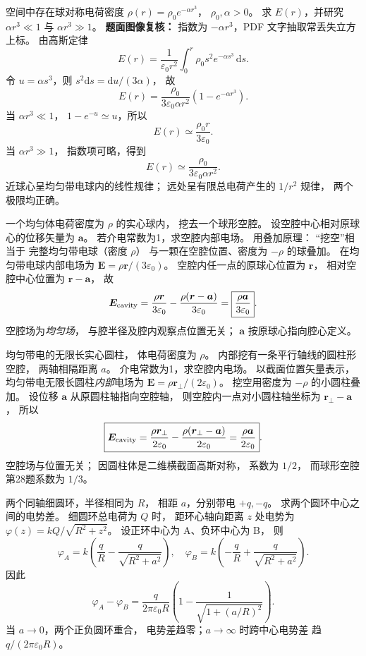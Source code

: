 空间中存在球对称电荷密度
$\rho(r)=\rho_0e^{-\alpha r^3}$，
$\rho_0,\alpha>0$。
求 $E(r)$，并研究
$\alpha r^3\ll1$ 与 $\alpha r^3\gg1$。
\exsolution
\textbf{题面图像复核：} 指数为
$-\alpha r^3$，PDF 文字抽取常丢失立方上标。
由高斯定律
\[
E(r)=\frac{1}{\varepsilon_0r^2}
\int_0^r\rho_0s^2e^{-\alpha s^3}\,\mathrm ds.
\]
令 $u=\alpha s^3$，则
$s^2\mathrm ds=\mathrm du/(3\alpha)$，
故
\[
\boxed{E(r)=\frac{\rho_0}
{3\varepsilon_0\alpha r^2}
(1-e^{-\alpha r^3})}.
\]
当 $\alpha r^3\ll1$，
$1-e^{-u}\simeq u$，所以
\[
\boxed{E(r)\simeq\frac{\rho_0r}{3\varepsilon_0}}.
\]
当 $\alpha r^3\gg1$，
指数项可略，得到
\[
\boxed{E(r)\simeq\frac{\rho_0}
{3\varepsilon_0\alpha r^2}}.
\]
\excheck 近球心呈均匀带电球内的线性规律；
远处呈有限总电荷产生的 $1/r^2$ 规律，
两个极限均正确。

一个均匀体电荷密度为 $\rho$ 的实心球内，
挖去一个球形空腔。
设空腔中心相对原球心的位移矢量为 $\bm a$。
若介电常数为1，求空腔内部电场。
\exsolution
用叠加原理：
“挖空”相当于
完整均匀带电球（密度 $\rho$）
与一颗在空腔位置、密度为 $-\rho$ 的球叠加。
在均匀带电球内部电场为
$\bm E=\rho\bm r/(3\varepsilon_0)$。
空腔内任一点的原球心位置为 $\bm r$，
相对空腔中心位置为 $\bm r-\bm a$，
故
\[
\bm E_{\rm cavity}
=\frac{\rho\bm r}{3\varepsilon_0}
-\frac{\rho(\bm r-\bm a)}{3\varepsilon_0}
=\boxed{\frac{\rho\bm a}{3\varepsilon_0}}.
\]
\excheck 空腔场为\emph{均匀场}，
与腔半径及腔内观察点位置无关；
$\bm a$ 按原球心指向腔心定义。

均匀带电的无限长实心圆柱，
体电荷密度为 $\rho$。
内部挖有一条平行轴线的圆柱形空腔，
两轴相隔距离 $a$。
介电常数为1，求空腔内电场。
\exsolution
以截面位置矢量表示，
均匀带电无限长圆柱\emph{内部}电场为
$\bm E=\rho\bm r_\perp/(2\varepsilon_0)$。
挖空用密度为 $-\rho$ 的小圆柱叠加。
设位移 $\bm a$ 从原圆柱轴指向空腔轴，
则空腔内一点对小圆柱轴坐标为
$\bm r_\perp-\bm a$，
所以
\[
\boxed{\bm E_{\rm cavity}=
\frac{\rho\bm r_\perp}{2\varepsilon_0}
-\frac{\rho(\bm r_\perp-\bm a)}{2\varepsilon_0}
=\frac{\rho\bm a}{2\varepsilon_0}}.
\]
\excheck 空腔场与位置无关；
因圆柱体是二维横截面高斯对称，
系数为 $1/2$，
而球形空腔第28题系数为 $1/3$。

两个同轴细圆环，半径相同为 $R$，
相距 $a$，分别带电 $+q,-q$。
求两个圆环中心之间的电势差。
\exsolution
细圆环总电荷为 $Q$ 时，
距环心轴向距离 $z$ 处电势为
$\varphi(z)=kQ/\sqrt{R^2+z^2}$。
设正环中心为 A、负环中心为 B，
则
\[
\varphi_A=k\left(\frac qR-\frac q{\sqrt{R^2+a^2}}\right),
\quad
\varphi_B=k\left(-\frac qR+\frac q{\sqrt{R^2+a^2}}\right).
\]
因此
\[
\boxed{\varphi_A-\varphi_B=
\frac q{2\pi\varepsilon_0R}
\left(1-\frac1{\sqrt{1+(a/R)^2}}\right)}.
\]
\excheck 当 $a\to0$，两个正负圆环重合，
电势差趋零；$a\to\infty$ 时跨中心电势差
趋 $q/(2\pi\varepsilon_0R)$。

